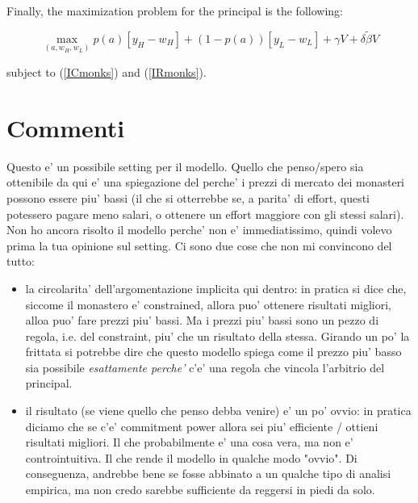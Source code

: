 \documentclass[12pt,a4paper]{article}
\begin{document}
Finally, the maximization problem for the principal is the following:

\begin{equation}\label{Principalmonks}
\max_{\left(a, w_{H}, w_{L}\right)} p\left(a\right)\left[ y_{H} - w_{H} \right] + \left(1-p\left(a\right)\right)\left[ y_{L} - w_{L} \right]+\gamma V + \delta \tilde{\beta}V
\end{equation}

subject to (\ref{ICmonks}) and (\ref{IRmonks}).

\section{Commenti}

Questo e' un possibile setting per il modello. Quello che penso/spero sia ottenibile da qui e' una spiegazione del perche' i prezzi di mercato dei monasteri possono essere piu' bassi (il che si otterrebbe se, a parita' di effort, questi potessero pagare meno salari, o ottenere un effort maggiore con gli stessi salari).
Non ho ancora risolto il modello perche' non e' immediatissimo, quindi volevo prima la tua opinione sul setting.
Ci sono due cose che non mi convincono del tutto:
\begin{itemize}
\item la circolarita' dell'argomentazione implicita qui dentro: in pratica si dice che, siccome il monastero e' constrained, allora puo' ottenere risultati migliori, alloa puo' fare prezzi piu' bassi. Ma i prezzi piu' bassi sono un pezzo di regola, i.e. del constraint, piu' che un risultato della stessa. Girando un po' la frittata si potrebbe dire che questo modello spiega come il prezzo piu' basso sia possibile \textit{esattamente perche'} c'e' una regola che vincola l'arbitrio del principal. 
\item il risultato (se viene quello che penso debba venire) e' un po' ovvio: in pratica diciamo che se c'e' commitment power allora sei piu' efficiente / ottieni risultati migliori. Il che probabilmente e' una cosa vera, ma non e' controintuitiva. Il che rende il modello in qualche modo "ovvio". Di conseguenza, andrebbe bene se fosse abbinato a un qualche tipo di analisi empirica, ma non credo sarebbe sufficiente da reggersi in piedi da solo.

\end{itemize}
\end{document}
